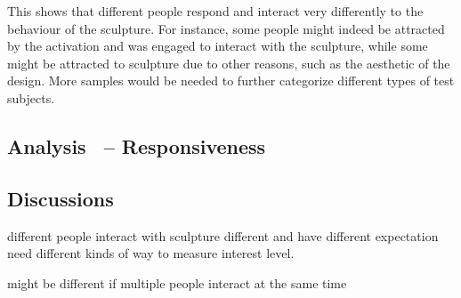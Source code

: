 This shows that different people respond and interact very differently to the behaviour of the sculpture. For instance, some people might indeed be attracted by the activation and was engaged to interact with the sculpture, while some might be attracted to sculpture due to other reasons, such as the aesthetic of the design. More samples would be needed to further categorize different types of test subjects. 


\FloatBarrier
\subsection{Analysis~ -- Responsiveness}



\subsection{Discussions}

different people interact with sculpture different and have different expectation
need different kinds of way to measure interest level. 

might be different if multiple people interact at the same time



